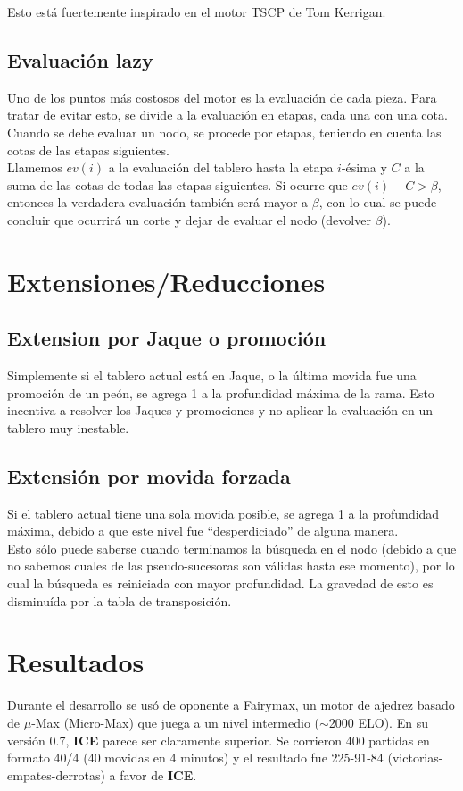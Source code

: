 \documentclass{article}
\newcommand{\ICE}[0]{{\bf ICE}}
\begin{document}
\begin{multicols}{2}
Esto está fuertemente inspirado en el motor TSCP\cite{tscp} de Tom
Kerrigan.

\subsection{Evaluación lazy}

Uno de los puntos más costosos del motor es la evaluación de cada
pieza. Para tratar de evitar esto, se divide a la evaluación en etapas,
cada una con una cota. Cuando se debe evaluar un nodo, se procede por
etapas, teniendo en cuenta las cotas de las etapas siguientes.
\\

Llamemos $ev(i)$ a la evaluación del tablero hasta la etapa $i$-ésima
y $C$ a la suma de las cotas de todas las etapas siguientes. Si ocurre
que $ev(i) - C > \beta$, entonces la verdadera evaluación también
será mayor a $\beta$, con lo cual se puede concluir que ocurrirá un
corte y dejar de evaluar el nodo (devolver $\beta$).

\section{Extensiones/Reducciones}

\subsection{Extension por Jaque o promoción}
Simplemente si el tablero actual está en Jaque, o la última movida fue
una promoción de un peón, se agrega 1 a la profundidad máxima de la
rama. Esto incentiva a resolver los Jaques y promociones y no aplicar la
evaluación en un tablero muy inestable.

\subsection{Extensión por movida forzada}
Si el tablero actual tiene una sola movida posible, se agrega 1 a la
profundidad máxima, debido a que este nivel fue ``desperdiciado'' de
alguna manera.
\\

Esto sólo puede saberse cuando terminamos la búsqueda en el nodo
(debido a que no sabemos cuales de las pseudo-sucesoras son válidas
hasta ese momento), por lo cual la búsqueda es reiniciada con mayor
profundidad. La gravedad de esto es disminuída por la tabla de
transposición.

\section{Resultados}
Durante el desarrollo se usó de oponente a Fairymax\cite{fairymax},
un motor de ajedrez basado de $\mu$-Max (Micro-Max) que juega a un
nivel intermedio ($\sim$2000 ELO\cite{wiki:elo}). En su versión 0.7,
\ICE{} parece ser claramente superior. Se corrieron 400 partidas en
formato 40/4 (40 movidas en 4 minutos) y el resultado fue 225-91-84
(victorias-empates-derrotas) a favor de \ICE{}.


\end{multicols}
\end{document}
